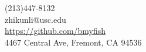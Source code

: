 \documentclass[margin,line]{resume}
\begin{document}
{
	\sc
    \hfill (213)447-8132                  		  \vspace{0mm}\\\vspace{0mm}%
    \hfill zhikunli@usc.edu            		      \vspace{0mm}\\\vspace{0mm}%
    \hfill \href{https://github.com/bmyfish}{https://github.com/bmyfish}             \vspace{0mm}\\\vspace{0mm}%
    \hfill 4467 Central Ave, Fremont, CA 94536     \vspace{0mm}\\\vspace{-10mm}%

}
\vspace{1mm}
\end{document}

